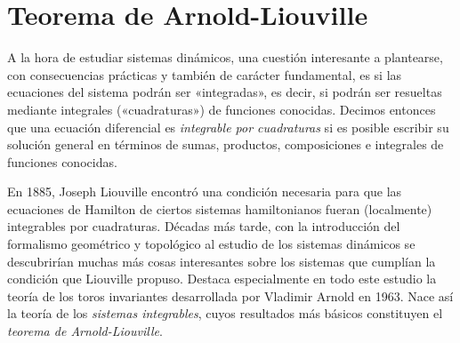 \section{Teorema de Arnold-Liouville}\label{sec:arnoldliouville}
A la hora de estudiar sistemas dinámicos, una cuestión interesante a plantearse, con consecuencias prácticas y también de carácter fundamental, es si las ecuaciones del sistema podrán ser «integradas», es decir, si podrán ser resueltas mediante integrales («cuadraturas») de funciones conocidas. Decimos entonces que una ecuación diferencial es \emph{integrable por cuadraturas} si es posible escribir su solución general en términos de sumas, productos, composiciones e integrales de funciones conocidas. 

En 1885, Joseph Liouville encontró una condición necesaria para que las ecuaciones de Hamilton de ciertos sistemas hamiltonianos fueran (localmente) integrables por cuadraturas. Décadas más tarde, con la introducción del formalismo geométrico y topológico al estudio de los sistemas dinámicos se descubrirían muchas más cosas interesantes sobre los sistemas que cumplían la condición que Liouville propuso. Destaca especialmente en todo este estudio la teoría de los toros invariantes desarrollada por Vladimir Arnold en 1963. Nace así la teoría de los \emph{sistemas integrables}, cuyos resultados más básicos constituyen el \emph{teorema de Arnold-Liouville}.

